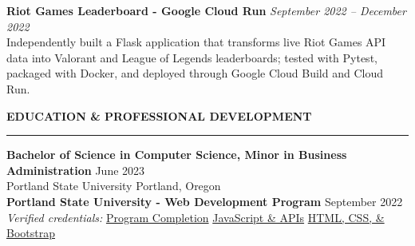 \documentclass[letterpaper,10pt]{article}
\newcommand{\resumesection}[1]{%
  \vspace{6pt}
  {\large\bfseries\MakeUppercase{#1}}\par
  \vspace{2pt}
  \hrule
  \vspace{3.5pt}
}
\newcommand{\project}[3]{%
  \textbf{#1} \hfill \textit{#2}\\
  #3
}
\begin{document}
\vspace{4pt}
\project{Riot Games Leaderboard - Google Cloud Run}{September 2022 -- December 2022}{%
Independently built a Flask application that transforms live Riot Games API data into Valorant and League of Legends leaderboards; tested with Pytest, packaged with Docker, and deployed through Google Cloud Build and Cloud Run.}

\resumesection{Education \& Professional Development}

\textbf{Bachelor of Science in Computer Science, Minor in Business Administration}
\hfill June 2023\\
Portland State University \hfill Portland, Oregon\\[2pt]
\textbf{Portland State University - Web Development Program}
\hfill September 2022\\
\textit{Verified credentials:}
\href{https://www.credential.net/d5c287ef-5859-4de5-81e1-039377d2f609}{Program Completion} \textbar{}
\href{https://www.credential.net/97ce4aa2-99d3-4365-9dbf-cbbb423643b4}{JavaScript \& APIs} \textbar{}
\href{https://www.credential.net/557f8a88-302f-4e70-bff1-672f41ed74d5}{HTML, CSS, \& Bootstrap}
\end{document}
